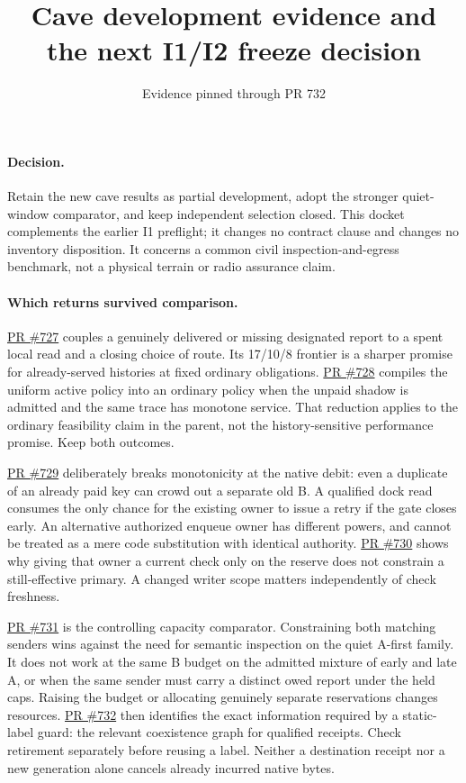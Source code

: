 \documentclass{article}
\title{Cave development evidence and the next I1/I2 freeze decision}
\author{}
\date{Evidence pinned through PR 732}
\newcommand{\pull}[1]{\href{https://github.com/eternal-november/eos-research-programmes/pull/#1}{PR \##1}}
\begin{document}
\maketitle

\paragraph{Decision.}
Retain the new cave results as partial development, adopt the stronger
quiet-window comparator, and keep independent selection closed. This
docket complements the earlier I1 preflight; it changes no contract
clause and changes no inventory disposition. It concerns a common
civil inspection-and-egress benchmark, not a physical terrain or
radio assurance claim.

\paragraph{Which returns survived comparison.}
\pull{727} couples a genuinely delivered or missing designated
report to a spent local read and a closing choice of route. Its
17/10/8 frontier is a sharper promise for already-served histories
at fixed ordinary obligations. \pull{728} compiles the uniform
active policy into an ordinary policy when the unpaid shadow is
admitted and the same trace has monotone service. That reduction
applies to the ordinary feasibility claim in the parent, not the
history-sensitive performance promise. Keep both outcomes.

\pull{729} deliberately breaks monotonicity at the native debit:
even a duplicate of an already paid key can crowd out a separate
old B. A qualified dock read consumes the only chance for the existing
owner to issue a retry if the gate closes early. An alternative
authorized enqueue owner has different powers, and cannot be treated
as a mere code substitution with identical authority. \pull{730}
shows why giving that owner a current check only on the reserve
does not constrain a still-effective primary. A changed writer
scope matters independently of check freshness.

\pull{731} is the controlling capacity comparator. Constraining
both matching senders wins against the need for semantic inspection
on the quiet A-first family. It does not work at the same B budget
on the admitted mixture of early and late A, or when the same sender
must carry a distinct owed report under the held caps. Raising the
budget or allocating genuinely separate reservations changes
resources. \pull{732} then identifies the exact information
required by a static-label guard: the relevant coexistence graph
for qualified receipts. Check retirement separately before reusing
a label. Neither a destination receipt nor a new generation alone
cancels already incurred native bytes.
\end{document}
